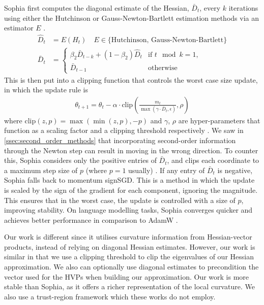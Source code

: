 Sophia first computes the diagonal estimate of the Hessian, $\bar{D}_t$, every $k$ iterations using either the Hutchinson or Gauss-Newton-Bartlett estimation methods via an estimator $E$ \citep{liu2023sophia}. 
\begin{align}
    \hat{D}_t &= E(H_t) \quad E \in \{\text{Hutchinson, Gauss-Newton-Bartlett} \} \\
    \bar{D}_t &= 
    \begin{cases}
        \beta_2 \bar{D}_{t-k} + (1 - \beta_2) \hat{D}_t & \text{if } t \mod k = 1, \\
        \bar{D}_{t-1} & \text{otherwise}
    \end{cases}
\end{align}
This is then put into a clipping function that controls the worst case size update, in which the update rule is
\begin{align}
    \theta_{t+1} = \theta_t - \alpha \cdot \text{clip}(\frac{m_t}{\max(\gamma \cdot \bar{D}_t, \epsilon)}, \rho)
\end{align}
where $\text{clip}(z, p) = \max(\min(z, p), -p)$ and $\gamma$, $\rho$ are hyper-parameters that function as a scaling factor and a clipping threshold respectively \citep{liu2023sophia}. We saw in \cref{ssec:second_order_methods} that incorporating second-order information through the Newton step can result in moving in the wrong direction. To counter this, Sophia considers only the positive entries of $\bar{D}_t$, and clips each coordinate to a maximum step size of $p$ (where $p = 1$ usually) \citep{liu2023sophia}. If any entry of $\bar{D}_t$ is negative, Sophia falls back to momentum signSGD. This is a method in which the update is scaled by the sign of the gradient for each component, ignoring the magnitude. This ensures that in the worst case, the update is controlled with a size of $p$, improving stability. On language modelling tasks, Sophia converges quicker and achieves better performance in comparison to AdamW \cite{liu2023sophia}.

Our work is different since it utilises curvature information from Hessian-vector products, instead of relying on diagonal Hessian estimates. 
However, our work is similar in that we use a clipping threshold to clip the eigenvalues of our Hessian approximation. We also can optionally use diagonal estimates to precondition the vector used for the HVPs when building our approximation. Our work is more stable than Sophia, as it offers a richer representation of the local curvature. We also use a trust-region framework which these works do not employ. 

